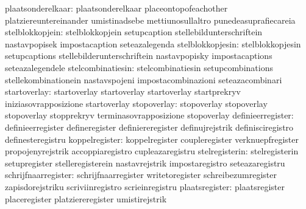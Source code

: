                plaatsonderelkaar: plaatsonderelkaar                placeontopofeachother
                                  platziereuntereinander           umistinadsebe
                                  mettiunosullaltro                punedeasuprafiecareia
                 stelblokkopjein: stelblokkopjein                  setupcaption
                                  stellebildunterschriftein        nastavpopisek
                                  impostacaption                   seteazalegenda %
                stelblokkopjesin: stelblokkopjesin                 setupcaptions
                                  stellebilderunterschriftein      nastavpopisky
                                  impostacaptions                  seteazalegendele %
               stelcombinatiesin: stelcombinatiesin                setupcombinations
                                  stellekombinationein             nastavspojeni
                                  impostacombinazioni              seteazacombinari
                    startoverlay: startoverlay                     startoverlay
                                  startoverlay                     startprekryv
                                  iniziasovrapposizione            startoverlay
                     stopoverlay: stopoverlay                      stopoverlay
                                  stopoverlay                      stopprekryv
                                  terminasovrapposizione           stopoverlay
               definieerregister: definieerregister                defineregister
                                  definiereregister                definujrejstrik
                                  definisciregistro                definesteregistru
                  koppelregister: koppelregister                   coupleregister
                                  verknuepfregister                propojenyrejstrik
                                  accoppiaregistro                 cupleazaregistru
                  stelregisterin: stelregisterin                   setupregister
                                  stelleregisterein                nastavrejstrik
                                  impostaregistro                  seteazaregistru
             schrijfnaarregister: schrijfnaarregister              writetoregister
                                  schreibezumregister              zapisdorejstriku
                                  scriviinregistro                 scrieinregistru
                  plaatsregister: plaatsregister                   placeregister
                                  platziereregister                umistirejstrik
